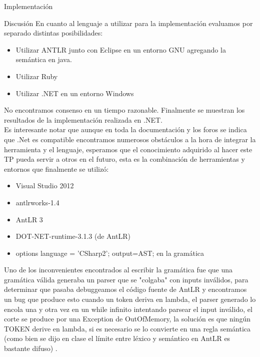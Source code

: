 \documentclass[a4paper,8pt]{article}
\begin{document}
\begin{section}{Implementación}
\begin{subsection}{Discusión}
En cuanto al lenguaje a utilizar para la implementación evaluamos por separado distintas posibilidades:
\begin{itemize}
 \item Utilizar ANTLR junto con Eclipse en un entorno GNU agregando la semántica en java.
\item Utilizar Ruby
\item Utilizar .NET en un entorno Windows
\end{itemize}

No encontramos consenso en un tiempo razonable. Finalmente se muestran los resultados de la implementación realizada en .NET.\\

Es interesante notar que aunque en toda la documentación y los foros se indica que .Net es compatible encontramos numerosos obstáculos a la hora de integrar la herramienta y el lenguaje, esperamos que el conocimiento adquirido al hacer este TP pueda servir a otros en el futuro, esta es la combinación de herramientas y entornos que finalmente se utilizó:
\begin{itemize}
 \item Visual Studio 2012
\item antlrworks-1.4
\item AntLR 3
\item DOT-NET-runtime-3.1.3 (de AntLR)
\item options { language = 'CSharp2'; output=AST; } en la gramática
\end{itemize}


Uno de los inconvenientes encontrados al escribir la gramática fue que una gramática válida generaba un parser que se "colgaba" con inputs inválidos, para determinar que pasaba debuggeamos el código fuente de AntLR y encontramos un bug que produce esto cuando un token deriva en lambda, el parser generado lo encola una y otra vez en un while infinito intentando parsear el input inválido, el corte se produce por una Exception de OutOfMemory, la solución es que ningún TOKEN derive en lambda, si es necesario se lo convierte en una regla semántica (como bien se dijo en clase el límite entre léxico y semántico en AntLR es bastante difuso) .


\end{subsection}
\end{section}
\end{document}
